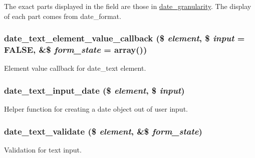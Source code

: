 The exact parts displayed in the field are those in \hyperlink{date_8module_a524c8837d65b4e1b512a7ea3ae33d016}{date\_\-granularity}. The display of each part comes from date\_\-format. \hypertarget{date__api__elements_8inc_ad77d04d89a7179dba8c76133d5484709}{
\subsubsection[{date\_\-text\_\-element\_\-value\_\-callback}]{\setlength{\rightskip}{0pt plus 5cm}date\_\-text\_\-element\_\-value\_\-callback (\$ {\em element}, \/  \$ {\em input} = {\ttfamily FALSE}, \/  \&\$ {\em form\_\-state} = {\ttfamily array()})}}
\label{date__api__elements_8inc_ad77d04d89a7179dba8c76133d5484709}
Element value callback for date\_\-text element. \hypertarget{date__api__elements_8inc_a7df91d2e64f95f23bffcb26de33d2ea8}{
\subsubsection[{date\_\-text\_\-input\_\-date}]{\setlength{\rightskip}{0pt plus 5cm}date\_\-text\_\-input\_\-date (\$ {\em element}, \/  \$ {\em input})}}
\label{date__api__elements_8inc_a7df91d2e64f95f23bffcb26de33d2ea8}
Helper function for creating a date object out of user input. \hypertarget{date__api__elements_8inc_aa6120a96cd6d04db4fe8e2ff15d39e68}{
\subsubsection[{date\_\-text\_\-validate}]{\setlength{\rightskip}{0pt plus 5cm}date\_\-text\_\-validate (\$ {\em element}, \/  \&\$ {\em form\_\-state})}}
\label{date__api__elements_8inc_aa6120a96cd6d04db4fe8e2ff15d39e68}
Validation for text input.

